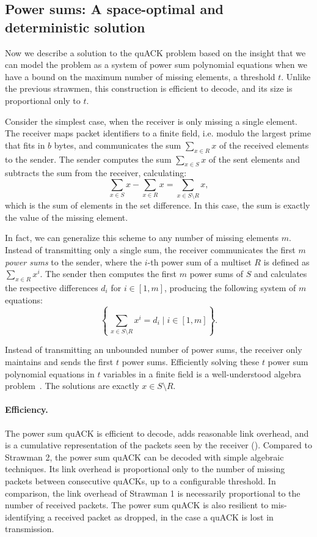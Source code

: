 

\subsection{Power sums: A space-optimal and deterministic solution}
\label{sec:quack:constructions:power-sum}

Now we describe a solution to the quACK problem based on the insight
that we can model the problem as a system of power sum polynomial equations
when we have a bound on the maximum number of missing elements, a threshold $t$.
Unlike the previous strawmen, this construction is efficient to decode, and
its size is proportional only to $t$.

Consider the simplest case, when the receiver is only missing a single element.
The receiver maps packet identifiers to a finite field,
i.e. modulo the largest prime that fits in $b$ bytes,
 and communicates the sum $\sum_{x \in R} x$ of the received
elements to
the sender. The sender computes the sum $\sum_{x \in S} x$ of the sent elements
and subtracts the sum from the receiver, calculating:
\[
    \sum_{x \in S} x - \sum_{x \in R} x = \sum_{x \in S\setminus R} x,
\]
which is the sum of elements in the set difference. In this case, the sum is
exactly the value of the missing element.

In fact, we can generalize this scheme to any number of missing elements $m$.
Instead of transmitting only a single sum, the receiver communicates
the first $m$ \emph{power sums} to the sender, where the $i$-th power sum of a
multiset $R$ is defined as $\sum_{x \in R} x^i$.
The sender then computes the first $m$ power sums of $S$ and calculates the
respective differences $d_i$ for $i \in [1,m]$, producing the following
system of $m$ equations:
\[
    \left\{\, \sum_{x \in S\setminus R} x^i = d_i \mid i \in [1,m] \right\}.
\]

Instead of transmitting an unbounded number of power sums, the receiver only
maintains and sends the first $t$ power sums. Efficiently solving these $t$
power sum polynomial equations in $t$ variables in a finite field is a
well-understood algebra problem~\cite{eppstein2011straggler}. The solutions are
exactly $x \in S \setminus R$.

\paragraph{Efficiency.}
The power sum quACK is efficient to decode, adds reasonable link overhead,
and is a cumulative representation of the packets seen by the receiver
().
Compared to Strawman 2, the power sum quACK can be decoded with simple
algebraic techniques.
Its link overhead is proportional only to the number of
missing packets between consecutive quACKs, up to a configurable threshold. In
comparison, the link overhead of Strawman 1 is necessarily proportional to the
number of received packets.
The power sum quACK is also resilient to mis-identifying a received packet as
dropped, in the case a quACK is lost in transmission.

